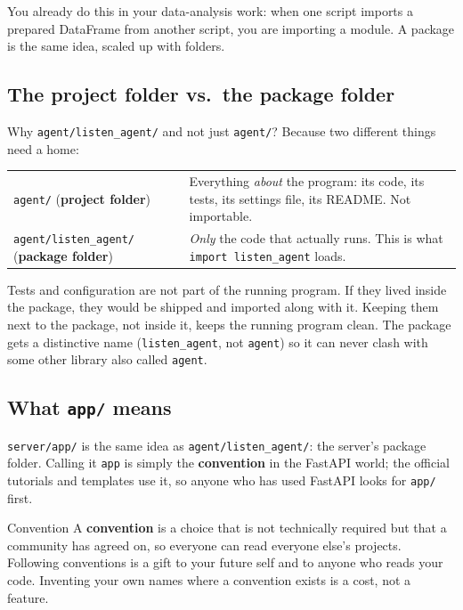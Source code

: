 \documentclass[11pt,a4paper]{article}
\begin{document}
You already do this in your data-analysis work: when one script imports a prepared
DataFrame from another script, you are importing a module. A package is the same idea,
scaled up with folders.

\subsection{The project folder vs.\ the package folder}
Why \texttt{agent/listen\_agent/} and not just \texttt{agent/}? Because two different
things need a home:

\begin{center}
\renewcommand{\arraystretch}{1.2}
\begin{tabularx}{\textwidth}{l X}
\toprule
\texttt{agent/} (\textbf{project folder}) & Everything \emph{about} the program: its code, its tests, its
settings file, its README. Not importable. \\
\texttt{agent/listen\_agent/} (\textbf{package folder}) & \emph{Only} the code that actually runs. This is what
\texttt{import listen\_agent} loads. \\
\bottomrule
\end{tabularx}
\end{center}

\begin{why}
Tests and configuration are not part of the running program. If they lived inside the
package, they would be shipped and imported along with it. Keeping them next to the package,
not inside it, keeps the running program clean. The package gets a distinctive name
(\texttt{listen\_agent}, not \texttt{agent}) so it can never clash with some other
library also called \texttt{agent}.
\end{why}

\subsection{What \texttt{app/} means}
\texttt{server/app/} is the same idea as \texttt{agent/listen\_agent/}: the server's package
folder. Calling it \texttt{app} is simply the \textbf{convention} in the FastAPI world; the
official tutorials and templates use it, so anyone who has used FastAPI looks for
\texttt{app/} first.

\begin{concept}{Convention}
A \textbf{convention} is a choice that is not technically required but that a community has
agreed on, so everyone can read everyone else's projects. Following conventions is a gift to
your future self and to anyone who reads your code. Inventing your own names where a
convention exists is a cost, not a feature.
\end{concept}
\end{document}
